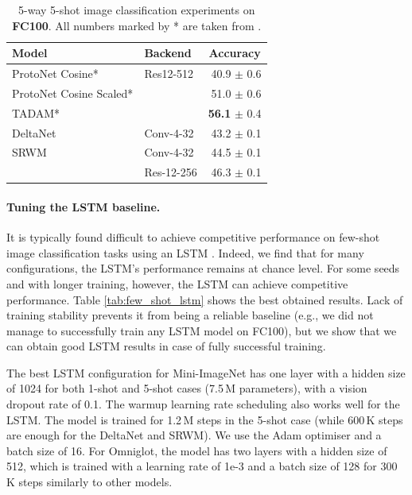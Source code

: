 \documentclass[nohyperref]{article}
\theoremstyle{plain}
\theoremstyle{definition}
\theoremstyle{remark}
\begin{document}
\begin{table}[h]
\caption{5-way 5-shot image classification experiments on \textbf{FC100}.
All numbers marked by * are taken from \citet{OreshkinLL18}.
}
\label{tab:fc100}
\begin{center}
\begin{tabular}{llr}
\toprule
Model & Backend & \multicolumn{1}{c}{Accuracy}  \\ \midrule 
ProtoNet Cosine* & Res12-512 & 40.9 $\pm$ 0.6 \\
ProtoNet Cosine Scaled* & & 51.0 $\pm$ 0.6 \\ 
TADAM*   &  &  \textbf{56.1} $\pm$ 0.4 \\  \midrule \midrule
DeltaNet   & Conv-4-32  & 43.2 $\pm$ 0.1 \\
SRWM   & Conv-4-32  & 44.5 $\pm$ 0.1 \\
       & Res-12-256 & 46.3 $\pm$ 0.1 \\
\bottomrule
\end{tabular}
\end{center}
\end{table}


\paragraph{Tuning the LSTM baseline.}
It is typically found difficult to achieve competitive performance on few-shot image classification tasks using an LSTM \citep{mishra2018a}.
Indeed, we find that for many configurations, the LSTM's performance remains at chance level.
For some seeds and with longer training, however, the LSTM can achieve competitive performance.
Table \ref{tab:few_shot_lstm} shows the best obtained results.
Lack of training stability prevents it from being a reliable baseline (e.g., we did not manage to successfully train any LSTM model on FC100), but we show that we can obtain good LSTM results in case of fully successful training.

The best LSTM configuration for Mini-ImageNet has one layer with a hidden size of 1024 for both 1-shot and 5-shot cases (7.5\,M parameters), with a vision dropout rate of 0.1.
The warmup learning rate scheduling also works well for the LSTM.
The model is trained for 1.2\,M steps in the 5-shot case (while 600\,K steps are enough for the DeltaNet and SRWM).
We use the Adam optimiser \citep{kingma2014adam} and a batch size of 16.
For Omniglot, the model has two layers with a hidden size of 512, which is trained with a learning rate of 1e-3 and a batch size of 128 for 300 K steps similarly to other models.
\end{document}
